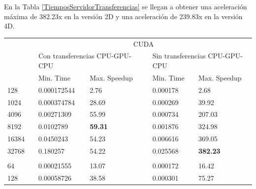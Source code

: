 En la Tabla \ref{TiemposServidorTransferencias} se llegan a obtener una aceleración máxima de 382.23x en la versión 2D y una aceleración de 239.83x en la versión 4D.  
\raggedbottom
\begin{table}[H]
    \centering
    \begin{tabular}{lllllll}
    \multicolumn{1}{c}{} & \multicolumn{1}{c}{} & \multicolumn{5}{c}{CUDA}                                                                                    \\ 
    \cline{3-7}
                         &                      & \multicolumn{2}{l}{Con transferencias CPU-GPU-CPU} &  & \multicolumn{2}{l}{Sin transferencias CPU-GPU-CPU}  \\ 
    \cline{3-4}\cline{6-7}
                         &                      & Min. Time   & Max. Speedup                         &  & Min. Time & Max. Speedup                            \\
    128                  &                      & 0.000172544 & 2.76                                 &  & 0.000178  & 2.68                                    \\
    1024                 &                      & 0.000374784 & 28.69                                &  & 0.000269  & 39.92                                   \\
    4096                 &                      & 0.00271309  & 55.99                                &  & 0.000734  & 207.03                                  \\
    8192                 &                      & 0.0102789   & \textbf{59.31}                       &  & 0.001876  & 324.98                                  \\
    16384                &                      & 0.0450243   & 54.23                                &  & 0.006616  & 369.05                                  \\
    32768                &                      & 0.180257    & 54.22                                &  & 0.025568  & \textbf{382.23}                         \\
                         &                      &             &                                      &  &           &                                         \\
    64                   &                      & 0.00021555  & 13.07                                &  & 0.000172  & 16.42                                   \\
    128                  &                      & 0.00058726  & 38.58                                &  & 0.000301  & 75.27                                   \\

\end{tabular}
\end{table}
